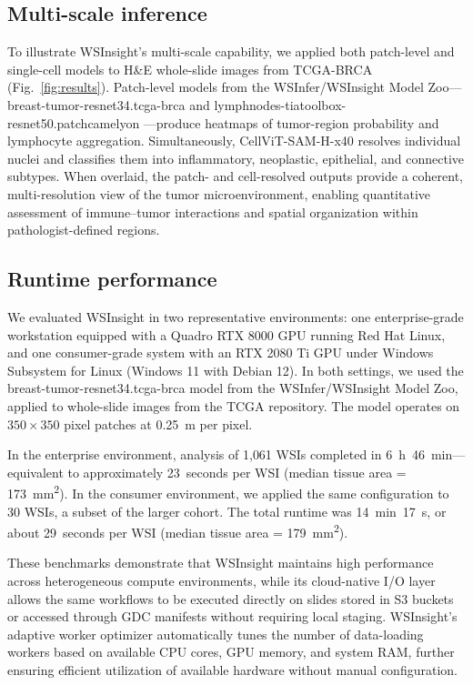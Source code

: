 \documentclass[sn-mathphys-num]{sn-jnl}%
\theoremstyle{thmstyleone}%
\theoremstyle{thmstyletwo}%
\theoremstyle{thmstylethree}%
\begin{document}
	\subsection{Multi-scale inference}
	
	To illustrate WSInsight's multi-scale capability, we applied both patch-level and single-cell models to H\&E whole-slide images from TCGA-BRCA (Fig.~\ref{fig:results}). Patch-level models from the WSInfer/WSInsight Model Zoo---breast-tumor-resnet34.tcga-brca \cite{Le:2020} and lymphnodes-tiatoolbox-resnet50.patchcamelyon \cite{Veeling:2018,Pocock:2022,Litjens:2018}---produce heatmaps of tumor-region probability and lymphocyte aggregation. Simultaneously, CellViT-SAM-H-x40 \cite{Horst:2024} resolves individual nuclei and classifies them into inflammatory, neoplastic, epithelial, and connective subtypes. When overlaid, the patch- and cell-resolved outputs provide a coherent, multi-resolution view of the tumor microenvironment, enabling quantitative assessment of immune--tumor interactions and spatial organization within pathologist-defined regions.
	
	\subsection{Runtime performance}
	
	We evaluated WSInsight in two representative environments: one enterprise-grade workstation equipped with a Quadro RTX 8000 GPU running Red Hat Linux, and one consumer-grade system with an RTX 2080 Ti GPU under Windows Subsystem for Linux (Windows 11 with Debian 12). In both settings, we used the breast-tumor-resnet34.tcga-brca model from the WSInfer/WSInsight Model Zoo, applied to whole-slide images from the TCGA repository. The model operates on $350 \times 350$ pixel patches at 0.25~\textmu m per pixel.
	
	In the enterprise environment, analysis of 1{,}061 WSIs completed in 6~h~46~min---equivalent to approximately 23~seconds per WSI (median tissue area = 173~mm\textsuperscript{2}). In the consumer environment, we applied the same configuration to 30 WSIs, a subset of the larger cohort. The total runtime was 14~min~17~s, or about 29~seconds per WSI (median tissue area = 179~mm\textsuperscript{2}).
	
	These benchmarks demonstrate that WSInsight maintains high performance across heterogeneous compute environments, while its cloud-native I/O layer allows the same workflows to be executed directly on slides stored in S3 buckets or accessed through GDC manifests without requiring local staging. WSInsight's adaptive worker optimizer automatically tunes the number of data-loading workers based on available CPU cores, GPU memory, and system RAM, further ensuring efficient utilization of available hardware without manual configuration.
\end{document}
